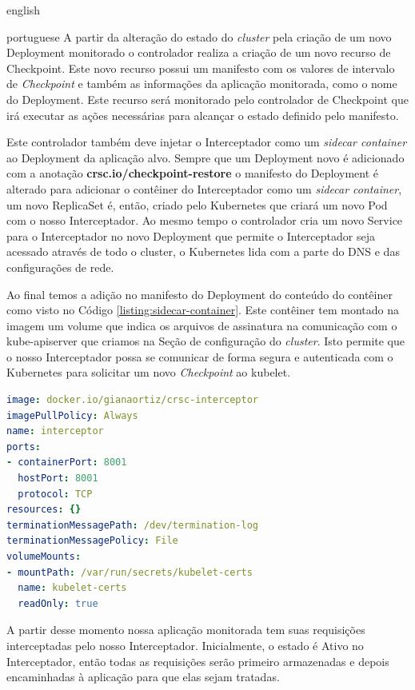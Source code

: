 \begin{otherlanguage*}{english}
\begin{otherlanguage*}{portuguese}
A partir da alteração do estado do \textit{cluster} pela criação de um novo Deployment
monitorado o controlador realiza a criação de um novo recurso de Checkpoint. Este novo
recurso possui um manifesto com os valores de intervalo de \textit{Checkpoint} e também
as informações da aplicação monitorada, como o nome do Deployment. Este recurso será 
monitorado pelo controlador de Checkpoint que irá executar as ações necessárias para
alcançar o estado definido pelo manifesto.

Este controlador também deve injetar o Interceptador como um \textit{sidecar container}
ao Deployment da aplicação alvo. Sempre que um Deployment novo é adicionado com a 
anotação \textbf{crsc.io/checkpoint-restore} o manifesto do Deployment é alterado
para adicionar o contêiner do Interceptador como um \textit{sidecar container}, um novo
ReplicaSet é, então, criado pelo Kubernetes que criará um novo Pod com o nosso
Interceptador. Ao mesmo tempo o controlador cria um novo Service para o Interceptador no
novo Deployment que permite o Interceptador seja acessado através de todo o cluster, o
Kubernetes lida com a parte do DNS e das configurações de rede.

Ao final temos a adição no manifesto do Deployment do conteúdo do contêiner como visto no
Código \ref{listing:sidecar-container}. Este contêiner tem montado na imagem um volume
que indica os arquivos de assinatura na comunicação com o kube-apiserver que criamos na
Seção de configuração do \textit{cluster}. Isto permite que o nosso Interceptador possa
se comunicar de forma segura e autenticada com o Kubernetes para solicitar um novo
\textit{Checkpoint} ao kubelet.

\begin{lstlisting}[language=yaml,caption={Configuração do Interceptador para o Deployment da aplicação alvo como sidecar container.},label={listing:sidecar-container}]
image: docker.io/gianaortiz/crsc-interceptor
imagePullPolicy: Always
name: interceptor
ports:
- containerPort: 8001
  hostPort: 8001
  protocol: TCP
resources: {}
terminationMessagePath: /dev/termination-log
terminationMessagePolicy: File
volumeMounts:
- mountPath: /var/run/secrets/kubelet-certs
  name: kubelet-certs
  readOnly: true
\end{lstlisting}

A partir desse momento nossa aplicação monitorada tem suas requisições interceptadas
pelo nosso Interceptador. Inicialmente, o estado é Ativo no Interceptador, então todas
as requisições serão primeiro armazenadas e depois encaminhadas à aplicação para que
elas sejam tratadas.


\end{otherlanguage*}
\end{otherlanguage*}
